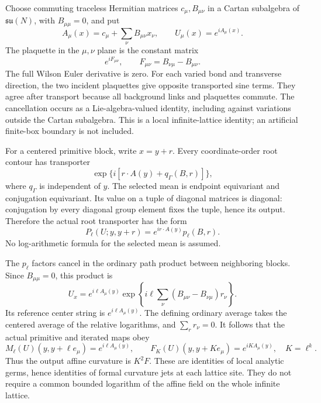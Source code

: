 \documentclass[11pt]{article}
\theoremstyle{remark}
\begin{document}
Choose commuting traceless Hermitian matrices \(c_\mu,B_{\mu\nu}\)
in a Cartan subalgebra of \(\mathfrak{su}(N)\), with
\(B_{\mu\mu}=0\), and put
\begin{equation}
 A_\mu(x)=c_\mu+\sum_\nu B_{\mu\nu}x_\nu,\qquad
 U_\mu(x)=e^{iA_\mu(x)}.
 \label{cdmom-affine}
\end{equation}
The plaquette in the \(\mu,\nu\) plane is the constant matrix
\[
 e^{iF_{\mu\nu}},\qquad F_{\mu\nu}=B_{\nu\mu}-B_{\mu\nu}.
\]
The full Wilson Euler derivative is zero. For each varied
bond and transverse direction, the two incident plaquettes
give opposite transported sine terms. They agree after
transport because all background links and plaquettes
commute. The cancellation occurs as a Lie-algebra-valued
identity, including against variations outside the Cartan
subalgebra. This is a local infinite-lattice identity;
an artificial finite-box boundary is not included.

For a centered primitive block, write \(x=y+r\).
Every coordinate-order root contour has transporter
\[
 \exp\{i[r\cdot A(y)+q_\Gamma(B,r)]\},
\]
where \(q_\Gamma\) is independent of \(y\).
The selected mean is endpoint equivariant and conjugation
equivariant. Its value on a tuple of diagonal matrices
is diagonal: conjugation by every diagonal group element
fixes the tuple, hence its output. Therefore the actual
root transporter has the form
\begin{equation}
 P_\ell(U;y,y+r)=e^{ir\cdot A(y)}p_\ell(B,r).
 \label{cdmom-contour}
\end{equation}
No log-arithmetic formula for the selected mean is assumed.

The \(p_\ell\) factors cancel in the ordinary path product
between neighboring blocks. Since \(B_{\mu\mu}=0\), this
product is
\[
 U_x=e^{i\ell A_\mu(y)}
       \exp\!\left\{i\ell\sum_\nu
                 (B_{\mu\nu}-B_{\nu\mu})r_\nu\right\}.
\]
Its reference center string is \(e^{i\ell A_\mu(y)}\).
The defining ordinary average takes the centered average
of the relative logarithms, and \(\sum_r r_\nu=0\).
It follows that the actual primitive and iterated maps obey
\begin{equation}
 M_\ell(U)(y,y+\ell e_\mu)=e^{i\ell A_\mu(y)},\qquad
 F_K(U)(y,y+Ke_\mu)=e^{iK A_\mu(y)},\quad K=\ell^k.
 \label{cdmom-average}
\end{equation}
Thus the output affine curvature is \(K^2F\).
These are identities of local analytic germs, hence
identities of formal curvature jets at each lattice site.
They do not require a common bounded logarithm of the
affine field on the whole infinite lattice.
\end{document}
